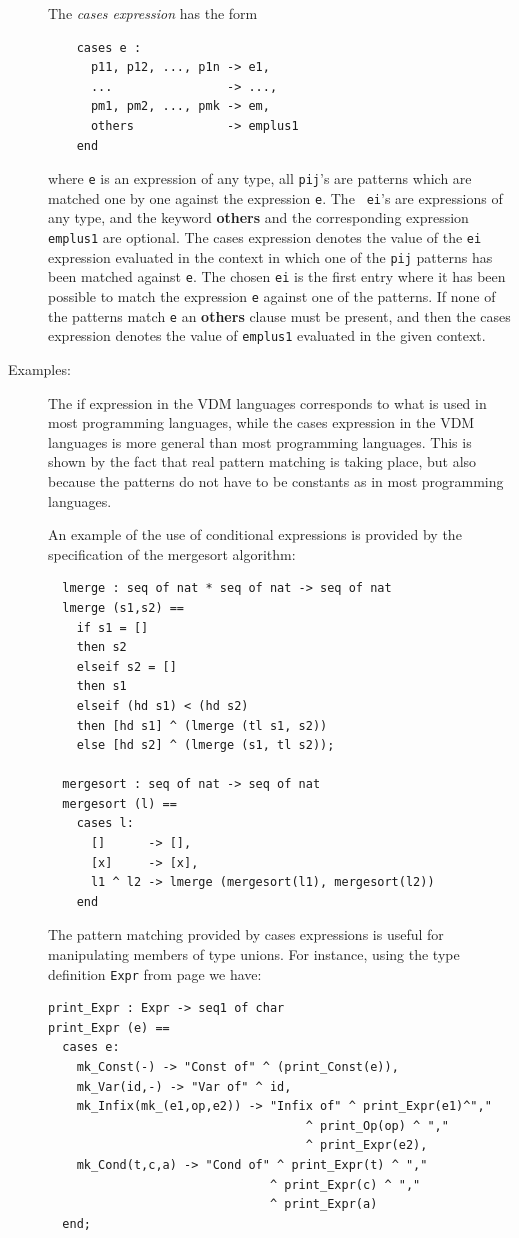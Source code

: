 \documentclass{overturerepchap}
\newcommand{\keyw}[1]{{\bf\ttfamily #1}}
\begin{document}
\begin{description}
  The {\it cases expression} has the form
  \begin{lstlisting}
    cases e :
      p11, p12, ..., p1n -> e1,
      ...                -> ...,
      pm1, pm2, ..., pmk -> em,
      others             -> emplus1
    end
  \end{lstlisting}
  where {\tt e} is an expression of any type, all {\tt pij}'s are patterns
  which are matched one by one against the expression {\tt e}.  The {\tt
    ei}'s are expressions of any type, and the keyword \keyw{others} and
  the corresponding expression {\tt emplus1} are optional. The cases
  expression denotes the value of the {\tt ei} expression evaluated in the
  context in which one of the {\tt pij} patterns has been matched against
  {\tt e}. The chosen {\tt ei} is the first entry where it has been
  possible to match the expression {\tt e} against one of the patterns. If
  none of the patterns match {\tt e} an \keyw{others} clause must be
  present, and then the cases expression denotes the value of {\tt emplus1}
  evaluated in the given context.
     
\item[Examples:] The if expression in the VDM languages 
  corresponds to what is used in most programming languages, while the
  cases expression in the VDM languages is more general than
  most programming languages. This is shown by the fact that real
  pattern matching is taking place, but also because the patterns do not
  have to be constants as in most programming languages.

  An example of the use of conditional expressions is provided by the
  specification of the mergesort algorithm:
  \begin{lstlisting}
  lmerge : seq of nat * seq of nat -> seq of nat
  lmerge (s1,s2) ==
    if s1 = [] 
    then s2
    elseif s2 = [] 
    then s1
    elseif (hd s1) < (hd s2)
    then [hd s1] ^ (lmerge (tl s1, s2))
    else [hd s2] ^ (lmerge (s1, tl s2));

  mergesort : seq of nat -> seq of nat
  mergesort (l) ==
    cases l:
      []      -> [],
      [x]     -> [x],
      l1 ^ l2 -> lmerge (mergesort(l1), mergesort(l2))
    end
  \end{lstlisting}
The pattern matching provided by cases expressions is useful for
  manipulating members of type unions. For instance, using the type
  definition \texttt{Expr} from page \pageref{exprdef} we have:
  \begin{lstlisting}
print_Expr : Expr -> seq1 of char
print_Expr (e) ==
  cases e:
    mk_Const(-) -> "Const of" ^ (print_Const(e)),
    mk_Var(id,-) -> "Var of" ^ id,
    mk_Infix(mk_(e1,op,e2)) -> "Infix of" ^ print_Expr(e1)^","
                                    ^ print_Op(op) ^ ","
                                    ^ print_Expr(e2),
    mk_Cond(t,c,a) -> "Cond of" ^ print_Expr(t) ^ ","
                               ^ print_Expr(c) ^ ","
                               ^ print_Expr(a)
  end;


\end{lstlisting}
\end{description}
\end{document}

